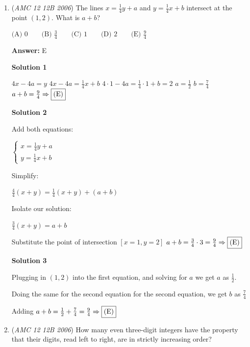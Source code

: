 \begin{enumerate}
 Alternative solution:

 If there was no restriction, there would be 4!=24 ways to sit. However, only 2/4 of the people can sit in the driver's seat, so our answer is $\frac{2}{4}\cdot 24= 12 \Rightarrow \text{(B)}$



	\item (\textit{AMC 12 12B 2006}) The lines $x = \frac 14y + a$ and $y = \frac 14x + b$ intersect at the point $(1,2)$.  What is $a + b$?


 $\text {(A) } 0 \qquad \text {(B) } \frac 34 \qquad \text {(C) } 1 \qquad \text {(D) } 2 \qquad \text {(E) } \frac 94$

 \textbf{Answer: }E



\textbf{Solution 1}

$4x-4a=y$
$4x-4a=\frac{1}{4}x+b$
$4\cdot1-4a=\frac{1}{4}\cdot1+b=2$
$a=\frac{1}{2}$
$b=\frac{7}{4}$
$a+b=\frac{9}{4} \Rightarrow \fbox{(E)}$




\textbf{Solution 2}

Add both equations:

 $\begin{cases}x=\frac{1}{4}y+a\\ y=\frac{1}{4}x+b \end{cases}$

 Simplify:

 $\frac{4}{4}(x+y)=\frac{1}{4}(x+y)+(a+b)$

 Isolate our solution:

 $\frac{3}{4}(x+y)=a+b$

 Substitute the point of intersection $[x=1, y=2]$
$a+b=\frac{3}{4}\cdot3=\frac{9}{4} \Rightarrow \fbox{(E)}$




\textbf{Solution 3}

Plugging in $(1,2)$ into the first equation, and solving for $a$ we get $a$ as $\frac{1}{2}$.

 Doing the same for the second equation for the second equation, we get $b$ as $\frac{7}{4}$

 Adding $a+b = \frac{1}{2} + \frac{7}{4} = \frac{9}{4} \Rightarrow \fbox{(E)}$



	\item (\textit{AMC 12 12B 2006}) How many even three-digit integers have the property that their digits, read left to right, are in strictly increasing order? 



\end{enumerate}
